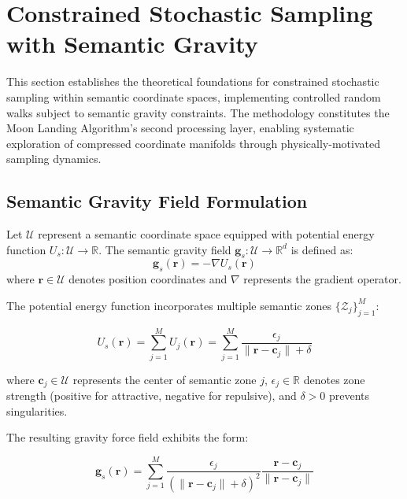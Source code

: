 \section{Constrained Stochastic Sampling with Semantic Gravity}
\label{sec:constrained-sampling}

This section establishes the theoretical foundations for constrained stochastic sampling within semantic coordinate spaces, implementing controlled random walks subject to semantic gravity constraints. The methodology constitutes the Moon Landing Algorithm's second processing layer, enabling systematic exploration of compressed coordinate manifolds through physically-motivated sampling dynamics.

\subsection{Semantic Gravity Field Formulation}

\begin{definition}
Let $\mathcal{U}$ represent a semantic coordinate space equipped with potential energy function $U_s: \mathcal{U} \to \mathbb{R}$. The semantic gravity field $\mathbf{g}_s: \mathcal{U} \to \mathbb{R}^d$ is defined as:
\begin{equation}
\mathbf{g}_s(\mathbf{r}) = -\nabla U_s(\mathbf{r})
\label{eq:semantic-gravity}
\end{equation}
where $\mathbf{r} \in \mathcal{U}$ denotes position coordinates and $\nabla$ represents the gradient operator.
\end{definition}

The potential energy function incorporates multiple semantic zones $\{\mathcal{Z}_j\}_{j=1}^M$:

\begin{equation}
U_s(\mathbf{r}) = \sum_{j=1}^M U_j(\mathbf{r}) = \sum_{j=1}^M \frac{\epsilon_j}{\|\mathbf{r} - \mathbf{c}_j\| + \delta}
\label{eq:semantic-potential}
\end{equation}

where $\mathbf{c}_j \in \mathcal{U}$ represents the center of semantic zone $j$, $\epsilon_j \in \mathbb{R}$ denotes zone strength (positive for attractive, negative for repulsive), and $\delta > 0$ prevents singularities.

The resulting gravity force field exhibits the form:

\begin{equation}
\mathbf{g}_s(\mathbf{r}) = \sum_{j=1}^M \frac{\epsilon_j}{(\|\mathbf{r} - \mathbf{c}_j\| + \delta)^2} \frac{\mathbf{r} - \mathbf{c}_j}{\|\mathbf{r} - \mathbf{c}_j\|}
\label{eq:gravity-force}
\end{equation}

